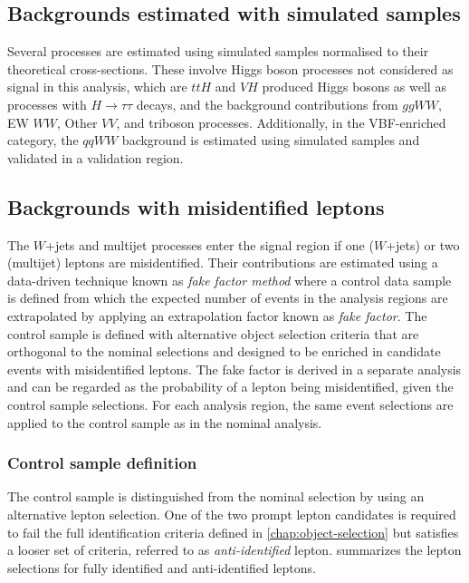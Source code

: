 
\subsection{Backgrounds estimated with simulated samples}
Several processes are estimated using simulated samples normalised to their theoretical cross-sections. These involve Higgs boson processes not considered as signal in this analysis, which are $ttH$ and $VH$ produced Higgs bosons as well as processes with $H\to\tau\tau$ decays, and the background contributions from $ggWW$, EW $WW$, Other $VV$, and triboson processes. Additionally, in the VBF-enriched \TwoJet category, the $qqWW$ background is estimated using simulated samples and validated in a validation region.



\subsection{Backgrounds with misidentified leptons}
The $W$+jets and multijet processes enter the signal region if one ($W$+jets) or two (multijet) leptons are misidentified.
Their contributions are estimated using a data-driven technique known as \emph{fake factor method} where a control data sample is defined from which the expected number of events in the analysis regions are extrapolated by applying an extrapolation factor known as \emph{fake factor}.
The control sample is defined with alternative object selection criteria that are orthogonal to the nominal selections and designed to be enriched in candidate events with misidentified leptons.
The fake factor is derived in a separate analysis and can be regarded as the probability of a lepton being misidentified, given the control sample selections.
For each analysis region, the same event selections are applied to the control sample as in the nominal analysis.


\subsubsection{Control sample definition}
The control sample is distinguished from the nominal selection by using an alternative lepton selection. 
One of the two prompt lepton candidates is required to fail the full identification criteria defined in \cref{chap:object-selection} but satisfies a looser set of criteria, referred to as \emph{anti-identified} lepton.
 summarizes the lepton selections for fully identified and anti-identified leptons. 

